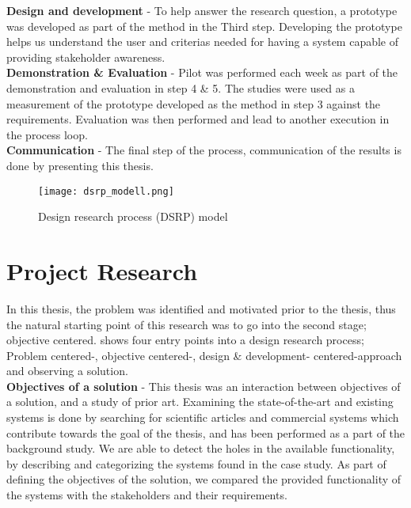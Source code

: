 \textbf{Design and development} - To help answer the research question, a prototype was developed as part of the 
method in the Third step. Developing the prototype helps us understand the 
user and criterias needed for having a system capable of providing stakeholder 
awareness.\\

\textbf{Demonstration \& Evaluation} - Pilot was performed each week as part of the demonstration and
evaluation in step 4 \& 5. The studies were used as a measurement of the prototype developed
as the method in step 3 against the requirements. Evaluation was then
performed and lead to another execution in the process loop.\\


\textbf{Communication} - The final step of the process, communication of the results is done by presenting this thesis.

\begin{figure}[!htbp]
	\texttt{[image: dsrp\_modell.png]}
	\caption[Design science research process (DSRP) model]{Design research process (DSRP)
	model\cite{peffers2006design}}
	\label{fig:DSRP}
\end{figure}



\section{Project Research} %
\label{sec:project_research}
In this thesis, the problem was 
identified and motivated prior to the thesis, thus the natural starting 
point of this research was to go into the second stage; objective 
centered.  shows four entry points into a design 
research process; Problem centered-, objective centered-, design \& development-
centered-approach and observing a solution. \\

\textbf{Objectives of a solution} - This thesis was an interaction between objectives of a solution, and a study 
of prior art. Examining the state-of-the-art and existing systems is done by 
searching for scientific articles and commercial systems which contribute 
towards the goal of the thesis, and has been performed as a part of the 
background study. We are able to detect the holes in the available 
functionality, by describing and categorizing the systems found in the case 
study. As part of defining the objectives of the solution, we compared the 
provided functionality of the systems with the stakeholders and their 
requirements.\\

